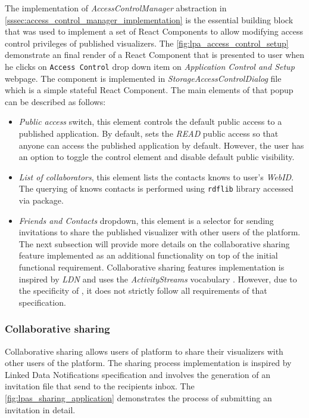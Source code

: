 The implementation of \textit{AccessControlManager} abstraction in \autoref{sssec:access_control_manager_implementation} is the essential building block that was used to implement a set of React Components to allow modifying access control privileges of published visualizers. The \autoref{fig:lpa_access_control_setup} demonstrate an final render of a React Component that is presented to user when he clicks on \texttt{Access Control} drop down item on \textit{Application Control and Setup} webpage. The component is implemented in \textit{StorageAccessControlDialog} file which is a simple stateful React Component. The main elements of that popup can be described as follows:
\begin{itemize}
    \item \textit{Public access} switch, this element controls the default public access to a published application. By default, \lpa{} sets the \textit{READ} public access so that anyone can access the published application by default. However, the user has an option to toggle the control element and disable default public visibility. 
    \item \textit{List of collaborators}, this element lists the contacts knows to user's \textit{WebID}. The querying of knows contacts is performed using \texttt{rdflib} library accessed via \lpas{} package. 
    \item \textit{Friends and Contacts} dropdown, this element is a selector for sending invitations to share the published visualizer with other users of the platform. The next subsection will provide more details on the collaborative sharing feature implemented as an additional functionality on top of the initial functional requirement. Collaborative sharing features implementation is inspired by \textit{\gls{LDN}} \cite{ldn} and uses the \textit{ActivityStreams} vocabulary \cite{activitystreams}. However, due to the specificity of \lpa{}, it does not strictly follow all requirements of that specification. 
\end{itemize}

\subsubsection{Collaborative sharing}
\label{ssssec:collaborative_sharing}

Collaborative sharing allows users of \lpa{} platform to share their visualizers with other users of the platform. The sharing process implementation is inspired by Linked Data Notifications specification  and involves the generation of an invitation file that send to the recipients inbox. The \autoref{fig:lpas_sharing_application} demonstrates the process of submitting an invitation in detail.

